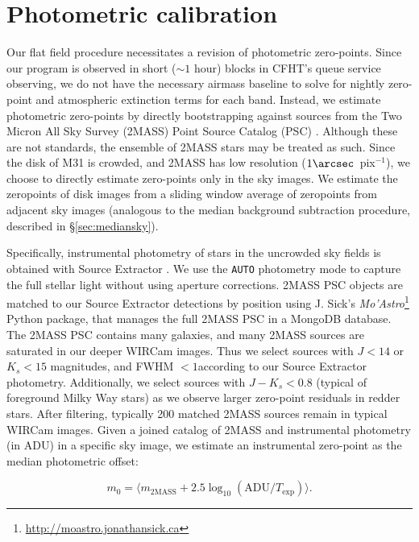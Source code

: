 \documentclass[iop]{emulateapj}
\newcommand{\sw}[1]{\textit{#1}} %
\newcommand{\Sec}[1]{\S\ref{sec:#1}}  %
\begin{document}
\section{Photometric calibration}
\label{sec:photocal}

Our flat field procedure necessitates a revision of photometric zero-points.
Since our program is observed in short ($\sim 1$ hour) blocks in CFHT's queue service observing, we do not have the necessary airmass baseline to solve for nightly zero-point and atmospheric extinction terms for each band.
Instead, we estimate photometric zero-points by directly bootstrapping against sources from the Two Micron All Sky Survey (2MASS) Point Source Catalog (PSC) \citep{Skrutskie:2006}.
Although these are not standards, the ensemble of 2MASS stars may be treated as such.
Since the disk of M31 is crowded, and 2MASS has low resolution ($1\arcsec$~pix$^{-1}$), we choose to directly estimate zero-points only in the sky images.
We estimate the zeropoints of disk images from a sliding window average of zeropoints from adjacent sky images (analogous to the median background subtraction procedure, described in \Sec{mediansky}).

Specifically, instrumental photometry of stars in the uncrowded sky fields is obtained with Source Extractor \citep{Bertin:1996}.
We use the \texttt{AUTO} photometry mode to capture the full stellar light without using aperture corrections.
2MASS PSC objects are matched to our Source Extractor detections by position using J. Sick's \sw{Mo'Astro}\footnote{\url{http://moastro.jonathansick.ca}} Python package, that manages the full 2MASS PSC in a MongoDB database.
The 2MASS PSC contains many galaxies, and many 2MASS sources are saturated in our deeper WIRCam images.
Thus we select sources with $J < 14$ or $K_s < 15$ magnitudes, and FWHM $<1$\arcsec according to our Source Extractor photometry.
Additionally, we select sources with $J-K_s < 0.8$ (typical of foreground Milky Way stars) as we observe larger zero-point residuals in redder stars.
After filtering, typically 200 matched 2MASS sources remain in typical WIRCam images.
Given a joined catalog of 2MASS and instrumental photometry (in ADU) in a specific sky image, we estimate an instrumental zero-point as the median photometric offset:

\begin{equation}
  \label{eq:photcal}
  m_0 = \langle m_\mathrm{2MASS} + 2.5 \log_{10}(\mathrm{ADU}/T_\mathrm{exp}) \rangle.
\end{equation}
\end{document}

